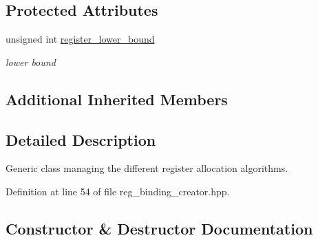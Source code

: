 \subsection*{Protected Attributes}
\begin{DoxyCompactItemize}
\item 
unsigned int \hyperlink{classreg__binding__creator_ab0cd825176cd09a5231572aad899ea8f}{register\+\_\+lower\+\_\+bound}
\begin{DoxyCompactList}\small\item\em lower bound \end{DoxyCompactList}\end{DoxyCompactItemize}
\subsection*{Additional Inherited Members}


\subsection{Detailed Description}
Generic class managing the different register allocation algorithms. 

Definition at line 54 of file reg\+\_\+binding\+\_\+creator.\+hpp.



\subsection{Constructor \& Destructor Documentation}
\mbox{\label{classreg__binding__creator_a2bb802408ad2ffe32277d65edf50d171}} 
